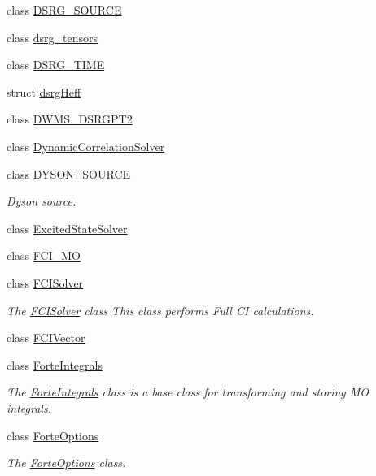 \begin{DoxyCompactItemize}
\item 
class \mbox{\hyperlink{classforte_1_1_d_s_r_g___s_o_u_r_c_e}{D\+S\+R\+G\+\_\+\+S\+O\+U\+R\+CE}}
\item 
class \mbox{\hyperlink{classforte_1_1dsrg__tensors}{dsrg\+\_\+tensors}}
\item 
class \mbox{\hyperlink{classforte_1_1_d_s_r_g___t_i_m_e}{D\+S\+R\+G\+\_\+\+T\+I\+ME}}
\item 
struct \mbox{\hyperlink{structforte_1_1dsrg_heff}{dsrg\+Heff}}
\item 
class \mbox{\hyperlink{classforte_1_1_d_w_m_s___d_s_r_g_p_t2}{D\+W\+M\+S\+\_\+\+D\+S\+R\+G\+P\+T2}}
\item 
class \mbox{\hyperlink{classforte_1_1_dynamic_correlation_solver}{Dynamic\+Correlation\+Solver}}
\item 
class \mbox{\hyperlink{classforte_1_1_d_y_s_o_n___s_o_u_r_c_e}{D\+Y\+S\+O\+N\+\_\+\+S\+O\+U\+R\+CE}}
\begin{DoxyCompactList}\small\item\em Dyson source. \end{DoxyCompactList}\item 
class \mbox{\hyperlink{classforte_1_1_excited_state_solver}{Excited\+State\+Solver}}
\item 
class \mbox{\hyperlink{classforte_1_1_f_c_i___m_o}{F\+C\+I\+\_\+\+MO}}
\item 
class \mbox{\hyperlink{classforte_1_1_f_c_i_solver}{F\+C\+I\+Solver}}
\begin{DoxyCompactList}\small\item\em The \mbox{\hyperlink{classforte_1_1_f_c_i_solver}{F\+C\+I\+Solver}} class This class performs Full CI calculations. \end{DoxyCompactList}\item 
class \mbox{\hyperlink{classforte_1_1_f_c_i_vector}{F\+C\+I\+Vector}}
\item 
class \mbox{\hyperlink{classforte_1_1_forte_integrals}{Forte\+Integrals}}
\begin{DoxyCompactList}\small\item\em The \mbox{\hyperlink{classforte_1_1_forte_integrals}{Forte\+Integrals}} class is a base class for transforming and storing MO integrals. \end{DoxyCompactList}\item 
class \mbox{\hyperlink{classforte_1_1_forte_options}{Forte\+Options}}
\begin{DoxyCompactList}\small\item\em The \mbox{\hyperlink{classforte_1_1_forte_options}{Forte\+Options}} class. \end{DoxyCompactList}\item 

\end{DoxyCompactItemize}
